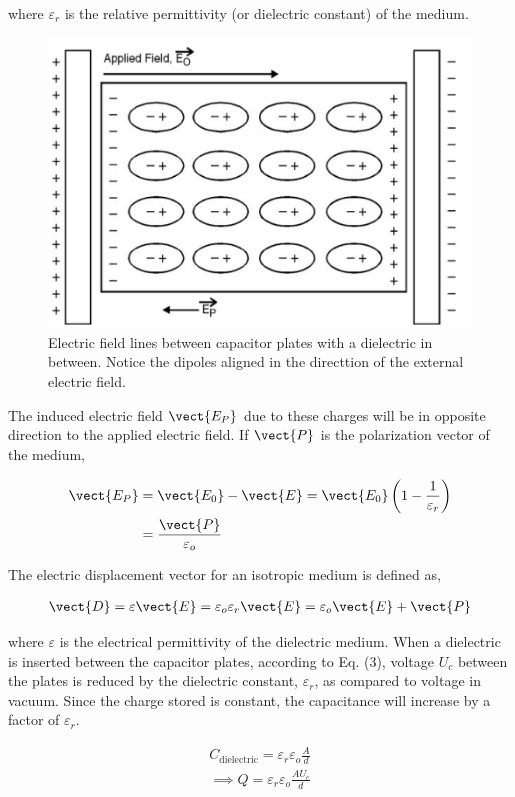 where $\varepsilon_r$ is the relative permittivity (or dielectric constant) of the medium. 

\begin{figure}[H]
    \centering
    \includegraphics[width=0.8\columnwidth]{images/f3.png}
    \caption{Electric field lines between capacitor plates with a dielectric in between. Notice the dipoles aligned in the directtion of the external electric field.}
    \label{fig:2}
\end{figure}

The induced electric field $\vect{E_P}$ due to these charges will be in opposite direction to the applied electric field. If $\vect{P}$ is the polarization vector of the medium,

\begin{align}
    \vect{E_P} &= \vect{E_0} - \vect{E} = \vect{E_0} \left(1 - \frac{1}{\varepsilon_r}\right) \nonumber\\
    &= \frac{\vect{P}}{\varepsilon_o}
\end{align}

The electric displacement vector for an isotropic medium is defined as,

\begin{align}
    \vect{D} = \varepsilon \vect{E} = \varepsilon_o \varepsilon_r \vect{E} = \varepsilon_o \vect{E} + \vect{P}
\end{align}

where $\varepsilon$ is the electrical permittivity of the dielectric medium. When a dielectric is inserted between the capacitor plates, according to Eq. (3), voltage $U_c$ between the plates is reduced by the dielectric constant, $\varepsilon_r$, as compared to voltage in vacuum. Since the charge stored is constant, the capacitance will increase by a factor of $\varepsilon_r$.

\begin{align}
    C_\text{dielectric} = \varepsilon_r \varepsilon_o \frac{A}{d}\\
    \implies Q = \varepsilon_r \varepsilon_o \frac{AU_c}{d} 
\end{align}

